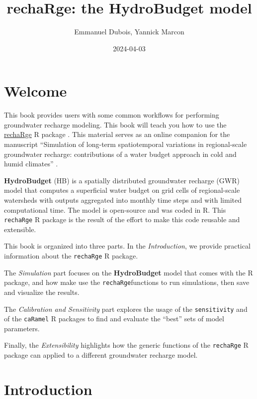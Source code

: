 \documentclass[
]{book}
\title{rechaRge: the HydroBudget model}
\author{Emmanuel Dubois, Yannick Marcon}
\date{2024-04-03}
\begin{document}
\maketitle

{
\setcounter{tocdepth}{1}
\tableofcontents
}
\hypertarget{welcome}{%
\chapter*{Welcome}\label{welcome}}

This book provides users with some common workflows for performing groundwater recharge modeling. This book will teach you how to use the \href{https://github.com/gwrecharge/rechaRge}{rechaRge} R package \citep{R-rechaRge}. This material serves as an online companion for the manuscript ``Simulation of long-term spatiotemporal variations in regional-scale groundwater recharge: contributions of a water budget approach in cold and humid climates'' \citep{hess-25-6567-2021}.

\textbf{HydroBudget} (HB) is a spatially distributed groundwater recharge (GWR) model that computes a superficial water budget on grid cells of regional-scale watersheds with outputs aggregated into monthly time steps and with limited computational time. The model is open-source and was coded in R. This \texttt{rechaRge} R package is the result of the effort to make this code reusable and extensible.

This book is organized into three parts. In the \emph{Introduction}, we provide practical information about the \texttt{rechaRge} R package.

The \emph{Simulation} part focuses on the \textbf{HydroBudget} model that comes with the R package, and how make use the \texttt{rechaRge}functions to run simulations, then save and visualize the results.

The \emph{Calibration and Sensitivity} part explores the usage of the \texttt{sensitivity} and of the \texttt{caRamel} R packages to find and evaluate the ``best'' sets of model parameters.

Finally, the \emph{Extensibility} highlights how the generic functions of the \texttt{rechaRge} R package can applied to a different groundwater recharge model.

\hypertarget{intro}{%
\chapter{Introduction}\label{intro}}
\end{document}
